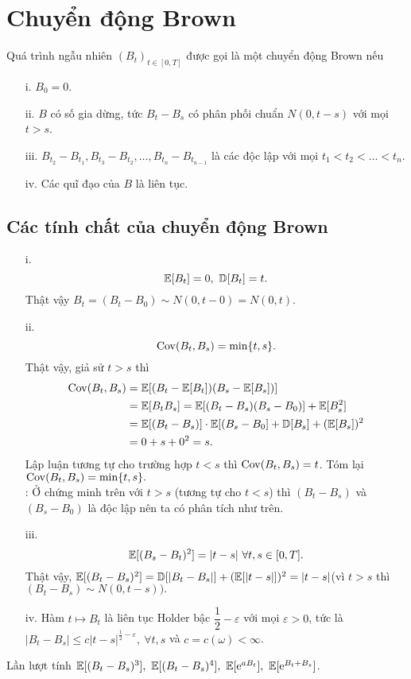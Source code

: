 \section{Chuyển động Brown}
\begin{defn}
    Quá trình ngẫu nhiên $(B_t)_{t\in [0,T]}$ được gọi là một chuyển động Brown nếu 
    \begin{itemize}
        \item[i.] $B_0 = 0.$
        \item[ii.] $B$ có số gia dừng, tức $B_t-B_s$ có phân phối chuẩn $N(0, t-s)$ với mọi $t>s$.
        \item[iii.] $B_{t_2}-B_{t_1}, B_{t_3}-B_{t_2}, \ldots, B_{t_n}-B_{t_{n-1}}$  là các \bnn độc lập với mọi $t_1<t_2<\ldots<t_n$.
        \item[iv.]Các quĩ đạo của $B$ là liên tục.
    \end{itemize}
\end{defn}
\subsection{Các tính chất của chuyển động Brown}
\begin{itemize}
    \item[i.] \[\mathbb{E}[B_t] = 0, ~\mathbb{D}[B_t] = t.\]
    Thật vậy $B_t=(B_t-B_0) \sim N(0, t-0) = N(0,t)$.
    \item[ii.] \[\mathrm{Cov}(B_t, B_s) = \min\{t,s\}.\]
    Thật vậy, giả sử $t>s$ thì 
    \begin{align*}
        \mathrm{Cov}(B_t, B_s) &= \mathbb{E}[(B_t-\mathbb{E}[B_t])(B_s-\mathbb{E}[B_s])]\\
        &= \mathbb{E}[B_tB_s]=\mathbb{E}[(B_t-B_s)(B_s-B_0)]+\mathbb{E}[B_s^2]\\
        &= \mathbb{E}[(B_t-B_s)]\cdot\mathbb{E}[(B_s-B_0]+\mathbb{D}[B_s]+(\mathbb{E}[B_s])^2\\
        &= 0+s+0^2=s.
    \end{align*}
    Lập luận tương tự cho trường hợp $t<s$ thì $\mathrm{Cov}(B_t,B_s) = t$. Tóm lại $\mathrm{Cov}(B_t, B_s) = \min\{t,s\}.$\\
    \remarkname: Ở chứng minh trên với $t>s$ (tương tự cho $t<s$) thì $(B_t-B_s)$ và $(B_s-B_0)$ là độc lập nên ta có phân tích như trên.
    \item[iii.] \[\mathbb{E}[(B_s-B_t)^2]=|t-s|~\forall t,s\in [0,T].\]
    Thật vậy, $\mathbb{E}[(B_t-B_s)^2]=\mathbb{D}[|B_t-B_s|] + (\mathbb{E}[|t-s|])^2=|t-s|$(vì $t>s$ thì $(B_t-B_s) \sim N(0,t-s)).$ 
    \item[iv.] Hàm $t\longmapsto B_t$ là liên tục Holder bậc $\dfrac{1}{2}-\varepsilon$ với mọi $\varepsilon>0$, tức là $|B_t-B_s|\leq c|t-s|^{\frac{1}{2}-\varepsilon},~\forall t,s$ và $c=c(\omega) <\infty$.
\end{itemize}
\begin{ex}
    Lần lượt tính $\mathbb{E}[(B_t-B_s)^3],~\mathbb{E}[(B_t-B_s)^4],~\mathbb{E}[\mathrm{e}^{aB_t}], ~\mathbb{E}[\mathrm{e}^{B_t+B_s}]$.
\end{ex}
